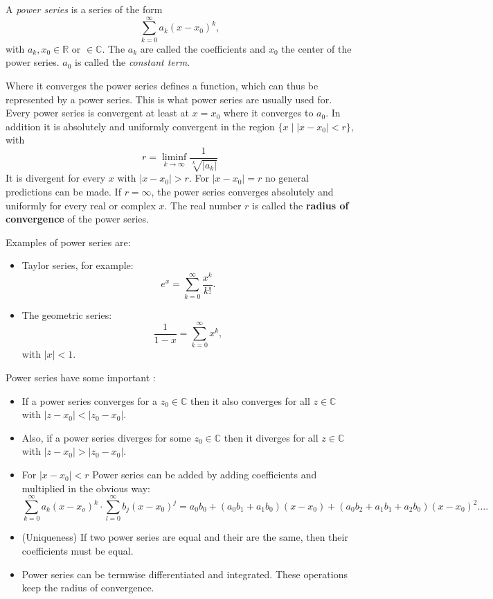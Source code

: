 \documentclass[12pt]{article}
\begin{document}
A \emph{power series} is a series of the form
$$\sum_{k=0}^{\infty}a_k(x-x_0)^k,$$
with $a_k,x_0\in\mathbb{R}$ or $\in\mathbb{C}$. The $a_k$ are called the coefficients and $x_0$ the center of the power series. $a_0$ is called the \emph{constant term}.

Where it converges the power series defines a function, which can thus be represented by a power series. This is what power series are usually used for.
Every power series is convergent at least at $x=x_0$ where it converges to $a_0$. In addition it is absolutely and uniformly convergent in the region $\{x\mid |x-x_0|<r\}$, with
$$r=\liminf_{k\to\infty}\frac{1}{\sqrt[k]{|a_k|}}$$
It is divergent for every $x$ with $|x-x_0| > r$. For $|x-x_0|= r$ no general predictions can be made. If $r=\infty$, the power series converges absolutely and uniformly for every real or complex $x.$ The real number $r$ is called the \textbf{radius of convergence} of the power series.

Examples of power series are:
\begin{itemize}
\item Taylor series, for example:
$$e^x=\sum_{k=0}^{\infty}\frac{x^k}{k!}.$$
\item The geometric series:
$$\frac{1}{1-x}=\sum_{k=0}^{\infty}x^k,$$
with $|x|<1$.
\end{itemize}

Power series have some important :
\begin{itemize}
\item If a power series converges for a $z_0\in\mathbb{C}$ then it also converges for all $z\in\mathbb{C}$ with $|z-x_0|<|z_0-x_0|$.
\item Also, if a power series diverges for some $z_0\in\mathbb{C}$ then it diverges for all $z\in\mathbb{C}$ with $|z-x_0|>|z_0-x_0|$.
\item For $|x-x_0|<r$ Power series can be added by adding coefficients and multiplied in the obvious way:
$$\sum_{k=0}^\infty a_k(x-x_o)^k\cdot\sum_{l=0}^\infty b_j(x-x_0)^j = a_0b_0+(a_0b_1+a_1b_0)(x-x_0)+(a_0b_2+a_1b_1+a_2b_0)(x-x_0)^2\ldots.$$
\item (Uniqueness) If two power series are equal and their  are the same, then their coefficients must be equal.
\item Power series can be termwise differentiated and integrated. These operations keep the radius of convergence.
\end{itemize}
\end{document}
